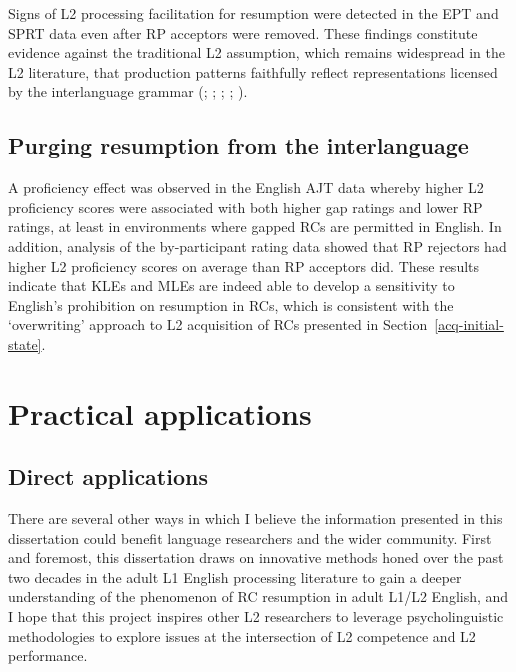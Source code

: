 Signs of L2 processing facilitation for resumption were detected in the EPT and SPRT data even after RP acceptors were removed. These findings constitute evidence against the traditional L2 assumption, which remains widespread in the L2 literature, that production patterns faithfully reflect representations licensed by the interlanguage grammar (\cite{algady2013}; \cite{gass1979}; \cite{hyltenstam1984}; \cite{marefat.abdollahnejad2014}; \cite{pavesi1986}).

\subsection{Purging resumption from the interlanguage}

A proficiency effect was observed in the English AJT data whereby higher L2 proficiency scores were associated with both higher gap ratings and lower RP ratings, at least in environments where gapped RCs are permitted in English. In addition, analysis of the by-participant rating data showed that RP rejectors had higher L2 proficiency scores on average than RP acceptors did. These results indicate that KLEs and MLEs are indeed able to develop a sensitivity to English's prohibition on resumption in RCs, which is consistent with the `overwriting' approach to L2 acquisition of RCs presented in Section~\ref{acq-initial-state}. 

\section{Practical applications}\label{dis-applications}

\subsection{Direct applications}

There are several other ways in which I believe the information presented in this dissertation could benefit language researchers and the wider community. First and foremost, this dissertation draws on innovative methods honed over the past two decades in the adult L1 English processing literature to gain a deeper understanding of the phenomenon of RC resumption in adult L1/L2 English, and I hope that this project inspires other L2 researchers to leverage psycholinguistic methodologies to explore issues at the intersection of L2 competence and L2 performance.

